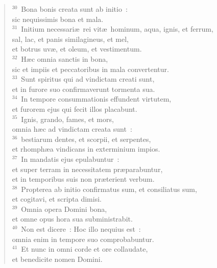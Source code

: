 \begin{flushleft}
\begin{verse}
${}^{30}$~Bona bonis creata sunt ab initio~:\\ sic nequissimis bona et mala.\\
${}^{31}$~Initium necessari\ae\ rei vit\ae\ hominum, aqua, ignis, et ferrum,\\ sal, lac, et panis similagineus, et mel,\\ et botrus uv\ae , et oleum, et vestimentum.\\
${}^{32}$~H\ae c omnia sanctis in bona,\\ sic et impiis et peccatoribus in mala convertentur.\\
${}^{33}$~Sunt spiritus qui ad vindictam creati sunt,\\ et in furore suo confirmaverunt tormenta sua.\\
${}^{34}$~In tempore consummationis effundent virtutem,\\ et furorem ejus qui fecit illos placabunt.\\
${}^{35}$~Ignis, grando, fames, et mors,\\ omnia h\ae c ad vindictam creata sunt~:\\
${}^{36}$~bestiarum dentes, et scorpii, et serpentes,\\ et rhomph\ae a vindicans in exterminium impios.\\
${}^{37}$~In mandatis ejus epulabuntur~:\\ et super terram in necessitatem pr\ae parabuntur,\\ et in temporibus suis non pr\ae terient verbum.\\
${}^{38}$~Propterea ab initio confirmatus sum, et consiliatus sum,\\ et cogitavi, et scripta dimisi.\\
${}^{39}$~Omnia opera Domini bona,\\ et omne opus hora sua subministrabit.\\
${}^{40}$~Non est dicere~: Hoc illo nequius est~:\\ omnia enim in tempore suo comprobabuntur.\\
${}^{41}$~Et nunc in omni corde et ore collaudate,\\ et benedicite nomen Domini.\end{verse}\end{flushleft}


